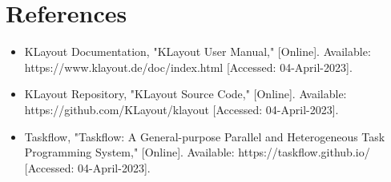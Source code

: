 \documentclass[sigconf]{acmart}
\begin{document}
\section{References}
\begin{itemize}
  \item KLayout Documentation, "KLayout User Manual," [Online]. Available: https://www.klayout.de/doc/index.html [Accessed: 04-April-2023].
  \item KLayout Repository, "KLayout Source Code," [Online]. Available: https://github.com/KLayout/klayout [Accessed: 04-April-2023].
  \item Taskflow, "Taskflow: A General-purpose Parallel and Heterogeneous Task Programming System," [Online]. Available: https://taskflow.github.io/ [Accessed: 04-April-2023].
\end{itemize}
\end{document}
